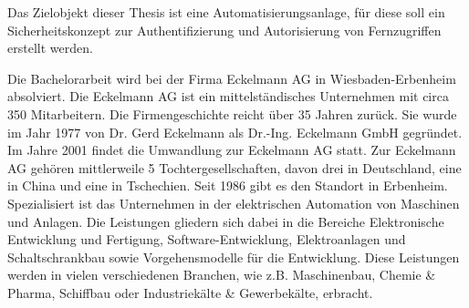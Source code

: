 \documentclass[11pt,a4paper]{report}
\begin{document}
Das Zielobjekt dieser Thesis ist eine Automatisierungsanlage, für diese soll ein Sicherheitskonzept zur Authentifizierung und Autorisierung von Fernzugriffen erstellt werden.

Die Bachelorarbeit wird bei der Firma Eckelmann AG in Wiesbaden-Erbenheim absolviert. Die Eckelmann AG ist ein mittelständisches Unternehmen mit circa 350 Mitarbeitern. Die Firmengeschichte reicht über 35 Jahren zurück. Sie wurde im Jahr 1977 von Dr. Gerd Eckelmann als  Dr.-Ing. Eckelmann GmbH gegründet. Im Jahre 2001 findet die Umwandlung zur Eckelmann AG statt. Zur Eckelmann AG gehören mittlerweile 5 Tochtergesellschaften, davon drei in Deutschland, eine in China und eine in Tschechien. Seit 1986 gibt es den Standort in Erbenheim. Spezialisiert ist das Unternehmen in der elektrischen Automation von Maschinen und Anlagen. Die Leistungen gliedern sich dabei in die Bereiche Elektronische Entwicklung und Fertigung, Software-Entwicklung, Elektroanlagen und Schaltschrankbau sowie Vorgehensmodelle für die Entwicklung. Diese Leistungen werden in vielen verschiedenen Branchen, wie z.B. Maschinenbau, Chemie \& Pharma, Schiffbau oder Industriekälte \& Gewerbekälte, erbracht.
\end{document}
